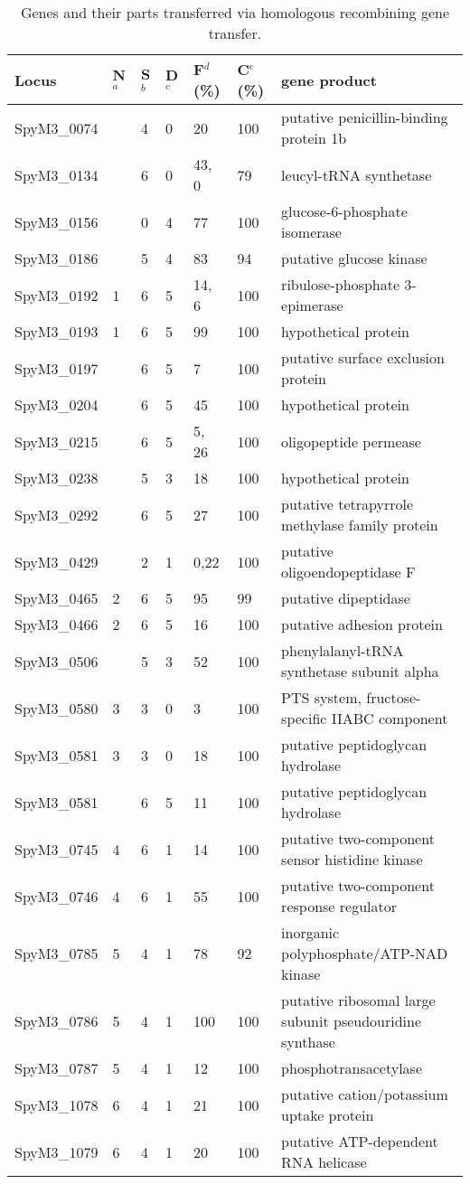 \documentclass[english]{article}
\providecommand{\tabularnewline}{\\}
\begin{document}
\begin{table}
\caption{\label{tab:genes-transfer}Genes and their parts transferred via 
homologous
recombining gene transfer. }
{\footnotesize
\begin{tabular}{lllllll}
\hline 
Locus  & N$^a$  & S$^b$  & D$^c$ & F$^d$(\%)  & C$^e$(\%)  & gene 
product\tabularnewline
\hline 
SpyM3\_0074  &  & 4  & 0  & 20  & 100  & putative penicillin-binding protein 1b 
\tabularnewline
SpyM3\_0134  &  & 6  & 0  & 43, 0 & 79  & leucyl-tRNA synthetase \tabularnewline
SpyM3\_0156  &  & 0  & 4  & 77  & 100  & glucose-6-phosphate isomerase 
\tabularnewline
SpyM3\_0186  &  & 5  & 4  & 83  & 94  & putative glucose kinase \tabularnewline
SpyM3\_0192  & 1 & 6  & 5  & 14, 6 & 100  & ribulose-phosphate 3-epimerase 
\tabularnewline
SpyM3\_0193  & 1 & 6  & 5  & 99  & 100  & hypothetical protein\tabularnewline
SpyM3\_0197  &  & 6  & 5  & 7  & 100  & putative surface exclusion 
protein\tabularnewline
SpyM3\_0204  &  & 6  & 5  & 45  & 100  & hypothetical protein \tabularnewline
SpyM3\_0215  &  & 6  & 5  & 5, 26 & 100  & oligopeptide permease \tabularnewline
SpyM3\_0238  &  & 5  & 3  & 18  & 100  & hypothetical protein \tabularnewline
SpyM3\_0292  &  & 6  & 5  & 27  & 100  & putative tetrapyrrole methylase family 
protein \tabularnewline
SpyM3\_0429  &  & 2  & 1  & 0,22  & 100  & putative oligoendopeptidase 
F\tabularnewline
SpyM3\_0465  & 2 & 6  & 5  & 95  & 99  & putative dipeptidase \tabularnewline
SpyM3\_0466  & 2 & 6  & 5  & 16  & 100  & putative adhesion protein 
\tabularnewline
SpyM3\_0506  &  & 5  & 3  & 52  & 100  & phenylalanyl-tRNA synthetase subunit 
alpha \tabularnewline
SpyM3\_0580  & 3 & 3  & 0  & 3  & 100  & PTS system, fructose-specific IIABC 
component\tabularnewline
SpyM3\_0581  & 3 & 3  & 0  & 18  & 100  & putative peptidoglycan hydrolase 
\tabularnewline
SpyM3\_0581  &  & 6  & 5  & 11  & 100  & putative peptidoglycan hydrolase 
\tabularnewline
SpyM3\_0745  & 4 & 6  & 1  & 14  & 100  & putative two-component sensor 
histidine kinase \tabularnewline
SpyM3\_0746  & 4 & 6  & 1  & 55  & 100  & putative two-component response 
regulator \tabularnewline
SpyM3\_0785  & 5 & 4  & 1  & 78  & 92  & inorganic polyphosphate/ATP-NAD 
kinase\tabularnewline
SpyM3\_0786  & 5 & 4  & 1  & 100  & 100  & putative ribosomal large subunit 
pseudouridine synthase \tabularnewline
SpyM3\_0787  & 5 & 4  & 1  & 12  & 100  & phosphotransacetylase \tabularnewline
SpyM3\_1078  & 6 & 4  & 1  & 21  & 100  & putative cation/potassium uptake 
protein \tabularnewline
SpyM3\_1079  & 6 & 4  & 1  & 20  & 100  & putative ATP-dependent RNA helicase 

\end{tabular}}
\end{table}
\end{document}

